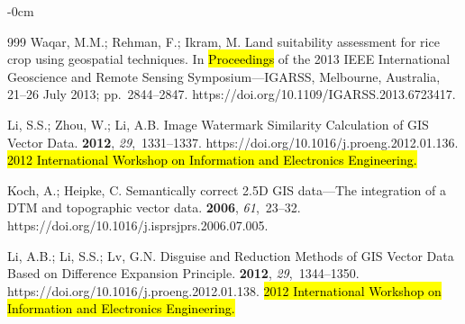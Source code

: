 \documentclass[data,article,accept,pdftex,moreauthors]{Definitions/mdpi}
\begin{document}
{\begin{adjustwidth}{-\extralength}{0cm}
\begin{thebibliography}{999}
Waqar, M.M.; Rehman, F.; Ikram, M.
\newblock Land suitability assessment for rice crop using geospatial
 techniques.
\newblock In \hl{Proceedings} %
 of the 2013 IEEE International Geoscience and Remote
 Sensing Symposium---IGARSS, Melbourne, Australia, 21--26 July 2013; pp.~2844--2847.
https://doi.org/10.1109/IGARSS.2013.6723417.


Li, S.S.; Zhou, W.; Li, A.B.
\newblock Image Watermark Similarity Calculation of GIS Vector Data.
 {\bf 2012}, {\em 29},~1331--1337. https://doi.org/10.1016/j.proeng.2012.01.136. \hl{2012 International Workshop on Information and Electronics Engineering.} %

Koch, A.; Heipke, C.
\newblock Semantically correct 2.5D GIS data---The integration of a DTM and
 topographic vector data.
 {\bf 2006},
 {\em 61},~23--32.
https://doi.org/10.1016/j.isprsjprs.2006.07.005.

Li, A.B.; Li, S.S.; Lv, G.N.
\newblock Disguise and Reduction Methods of GIS Vector Data Based on Difference
 Expansion Principle.
 {\bf 2012}, {\em 29},~1344--1350. https://doi.org/10.1016/j.proeng.2012.01.138. \hl{2012 International Workshop on Information and Electronics Engineering.} %



\end{thebibliography}
\end{adjustwidth}}
\end{document}
